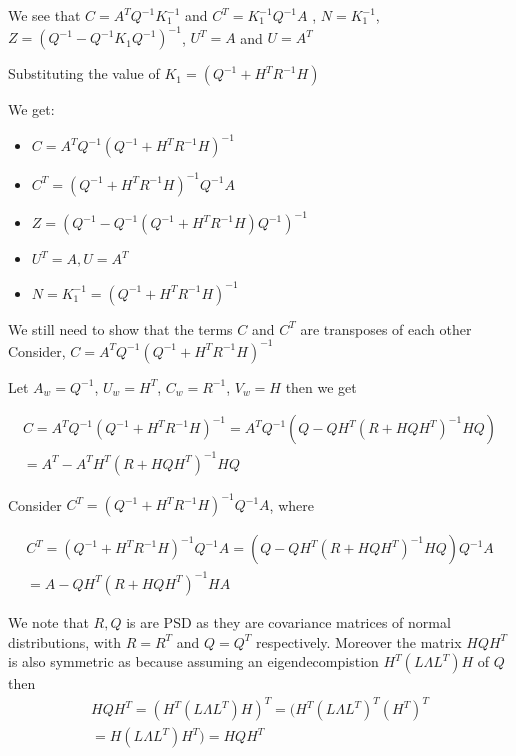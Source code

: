 \documentclass{tufte-handout}
\begin{document}
\begin{enumerate}[(a)]
    We see that $C = A^TQ^{-1}K_1^{-1} $ and  $C^T = K_1^{-1} Q^{-1}A$ , $N = K_1^{-1}$, $Z = (Q^{-1} - Q^{-1}K_1 Q^{-1})^{-1} $, $U^T =A $ and $U = A^T$

    Substituting the value of $K_1=(Q^{-1}  + H^TR^{-1}H) $

    We get: 
    \begin{itemize}
        \item  $C = A^TQ^{-1}(Q^{-1} + H^T R^{-1}H)^{-1}$
        \item  $C^T = (Q^{-1} + H^T R^{-1}H)^{-1}Q^{-1}A$
        \item $Z  = (Q^{-1} - Q^{-1}(Q^{-1}  + H^TR^{-1}H) Q^{-1})^{-1} $
        \item $U^T = A, U = A^T$
        \item $N  = K_1^{-1} = (Q^{-1} + H^TR^{-1}H)^{-1}$
    \end{itemize}
\end{enumerate}

We still need to show that the terms $C$ and $C^T$ are transposes 
of each other Consider, $C = A^TQ^{-1}(Q^{-1} + H^T R^{-1}H)^{-1}$

Let $A_w = Q^{-1}$, $U_w = H^T$, $C_w = R^{-1}$, $V_w = H$ then 
we get 

\begin{multline*}
    C  = A^{T}Q^{-1}(Q^{-1} + H^{T}R^{-1} H)^{-1} 
       =  A^T Q^{-1} ( Q - Q H^T (R + HQH^T)^{-1}HQ) \\ 
       =  A^T  - A^T H^T ( R + HQH^T)^{-1}  HQ
\end{multline*}


Consider $C^T = (Q^{-1} + H^T R^{-1}H)^{-1}Q^{-1}A$, where

\begin{multline}
   C^T = (Q^{-1} + H^T R^{-1}H)^{-1}Q^{-1}A  
       = (Q  - Q H^T (R + HQH^T)^{-1} HQ) Q^{-1}A \\ 
       = A - QH^T (R + HQH^T)^{-1} H A
       \label{c-transpose}
\end{multline}

We note that $R, Q$ is are PSD as they are covariance matrices of normal distributions, with $R = R^T$ and  $Q = Q^T$ respectively.  Moreover the matrix 
$H Q H^T$  is also symmetric as because assuming an 
eigendecompistion \cite{enwiki:1158373968} $H^T ( L \Lambda L ^T ) H$ of $Q$
then 
\begin{multline}
    HQH^T = (H^T (L \Lambda L^T) H)^T =  (H^T (L \Lambda L^T) ^T (H^T)^T \\ 
     = H (L \Lambda L^T) H^T) =   HQH^T
\end{multline}
\end{document}
